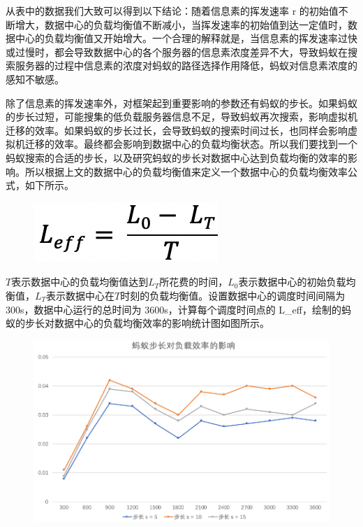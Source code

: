 从表中的数据我们大致可以得到以下结论：随着信息素的挥发速率 r 的初始值不断增大，数据中心的负载均衡值不断减小，当挥发速率的初始值到达一定值时，数据中心的负载均衡值又开始增大。一个合理的解释就是，当信息素的挥发速率过快或过慢时，都会导致数据中心的各个服务器的信息素浓度差异不大，导致蚂蚁在搜索服务器的过程中信息素的浓度对蚂蚁的路径选择作用降低，蚂蚁对信息素浓度的感知不敏感。

除了信息素的挥发速率外，对框架起到重要影响的参数还有蚂蚁的步长。如果蚂蚁的步长过短，可能搜集的低负载服务器信息不足，导致蚂蚁再次搜索，影响虚拟机迁移的效率。如果蚂蚁的步长过长，会导致蚂蚁的搜索时间过长，也同样会影响虚拟机迁移的效率。最终都会影响到数据中心的负载均衡状态。所以我们要找到一个蚂蚁搜索的合适的步长，以及研究蚂蚁的步长对数据中心达到负载均衡的效率的影响。所以根据上文的数据中心的负载均衡值来定义一个数据中心的负载均衡效率公式，如下所示。

\begin{figure}[ht]
  \centering
  \includegraphics{./Figure/IMG_Chap4_6.png}
  \caption{}\label{Fig:chap4_6}
\end{figure}

$T $表示数据中心的负载均衡值达到$ L_T $所花费的时间，$L_0 $表示数据中心的初始负载均衡值，$L_T $表示数据中心在$ T $时刻的负载均衡值。设置数据中心的调度时间间隔为 300s，数据中心运行的总时间为 3600s，计算每个调度时间点的 L_eff，绘制的蚂蚁的步长对数据中心的负载均衡效率的影响统计图如图所示。

\begin{figure}[ht]
  \centering
  \includegraphics{./Figure/IMG_Chap4_7.png}
  \caption{}\label{Fig:chap4_7}
\end{figure}

